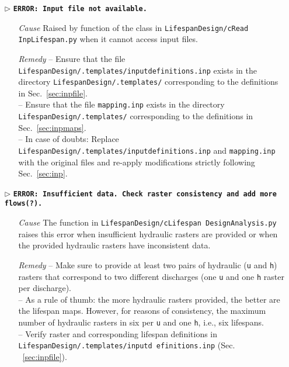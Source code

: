 \begin{itemize}
	\item[$\triangleright$]\textbf{\texttt{ERROR: Input file not available.}}
	\begin{itemize}
		\item[\textit{Cause}\hspace{0.27cm}] Raised by  function of the  class in \texttt{LifespanDesign/cRead InpLifespan.py} when it cannot access input files.
		\item[\textit{Remedy}] -- Ensure that the file \texttt{LifespanDesign/.templates/input{\myUnderscore}definitions.inp} exists in the directory \texttt{LifespanDesign/.templates/} corresponding to the definitions in Sec.~\ref{sec:inpfile}.\\
								-- Ensure that the file \texttt{mapping.inp} exists in the directory \texttt{LifespanDesign/.templates/} corresponding to the definitions in Sec.~\ref{sec:inpmaps}.\\
								-- In case of doubts: Replace \texttt{LifespanDesign/.templates/input{\myUnderscore}definitions.inp} and \texttt{mapping.inp} with the original files and re-apply modifications strictly following Sec.~\ref{sec:inp}.\\
	\end{itemize}
	
	\item[$\triangleright$]\textbf{\texttt{ERROR: Insufficient data. Check raster consistency and add more flows(?).}}
	\begin{itemize}
		\item[\textit{Cause}\hspace{0.27cm}] The  function in \texttt{LifespanDesign/cLifespan DesignAnalysis.py} raises this error when insufficient hydraulic rasters are provided or when the provided hydraulic rasters have inconsistent data.
		\item[\textit{Remedy}] -- Make sure to provide at least two pairs of hydraulic (\texttt{u} and \texttt{h}) rasters that correspond to two different discharges (one \texttt{u} and one \texttt{h} raster per discharge).\\
													 -- As a rule of thumb: the more hydraulic rasters provided, the better are the lifespan maps. However, for reasons of consistency, the maximum number of hydraulic rasters in six per \texttt{u} and one \texttt{h}, i.e., six lifespans.\\
													 -- Verify raster and corresponding lifespan definitions in \texttt{LifespanDesign/.templates/input{\myUnderscore}d efinitions.inp} (Sec. ~\ref{sec:inpfile}).\\
	\end{itemize}
	

\end{itemize}
